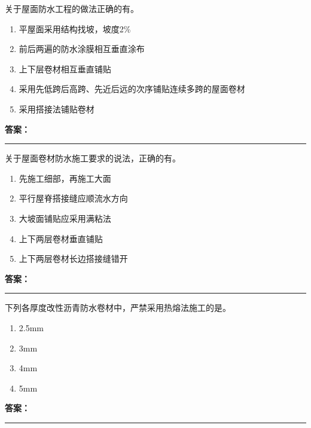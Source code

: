 \documentclass[UTF8,fontset=fandol,11pt]{ctexart}
\newcommand{\answerline}{\textcolor{answerred}{\rule{2.4cm}{0.7pt}}}
\begin{document}
\vspace{0.2em}

\begin{quizbox}[title={第 3 题}]
关于屋面防水工程的做法正确的有。\\
\begin{enumerate}[label=\Alph*.]
\item 平屋面采用结构找坡，坡度2\%
\item 前后两遍的防水涂膜相互垂直涂布
\item 上下层卷材相互垂直铺贴
\item 采用先低跨后高跨、先近后远的次序铺贴连续多跨的屋面卷材
\item 采用搭接法铺贴卷材
\end{enumerate}
\textbf{\textcolor{answerred}{答案：}} \answerline
\end{quizbox}

\vspace{0.2em}

\begin{quizbox}[title={第 4 题}]
关于屋面卷材防水施工要求的说法，正确的有。\\
\begin{enumerate}[label=\Alph*.]
\item 先施工细部，再施工大面
\item 平行屋脊搭接缝应顺流水方向
\item 大坡面铺贴应采用满粘法
\item 上下两层卷材垂直铺贴
\item 上下两层卷材长边搭接缝错开
\end{enumerate}
\textbf{\textcolor{answerred}{答案：}} \answerline
\end{quizbox}

\vspace{0.2em}

\begin{quizbox}[title={第 5 题}]
下列各厚度改性沥青防水卷材中，严禁采用热熔法施工的是。\\
\begin{enumerate}[label=\Alph*.]
\item 2.5mm
\item 3mm
\item 4mm
\item 5mm
\end{enumerate}
\textbf{\textcolor{answerred}{答案：}} \answerline
\end{quizbox}

\vspace{0.2em}
\end{document}
